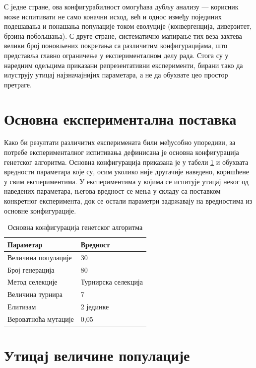 \documentclass[12pt,oneside]{memoir}
\begin{document}
С једне стране, ова конфигурабилност омогућава дубљу анализу — корисник може
испитивати не само коначни исход, већ и однос између појединих подешавања и
понашања популације током еволуције (конвергенција, диверзитет, брзина
побољшања). С друге стране, систематично мапирање тих веза захтева велики
број поновљених покретања са различитим конфигурацијама, што представља
главно ограничење у експерименталном делу рада. Стога су у наредним одељцима
приказани репрезентативни експерименти, бирани тако да илуструју утицај
најзначајнијих параметара, а не да обухвате цео простор претраге.

\section{Основна експериментална поставка}
\label{chp:exp-setup}

Како би резултати различитих експеримената били међусобно 
упоредиви, за потребе експерименталног испитивања дефинисана 
је основна конфигурација генетског алгоритма. Основна 
конфигурација приказана је у табели \ref{tab:ga-base-config} 
и обухвата вредности параметара које су, 
осим уколико није другачије наведено, коришћене у свим 
експериментима. У експериментима у којима се испитује 
утицај неког од наведених параметара, његова вредност 
се мења у складу са поставком конкретног експеримента, 
док се остали параметри задржавају на вредностима из 
основне конфигурације.

\begin{table}[!ht]
  \centering
  \begin{tabular}{ll}
    \toprule
    \textbf{Параметар} & \textbf{Вредност} \\
    \midrule
    Величина популације & 30 \\
    Број генерација & 80 \\
    Метод селекције & Турнирска селекција \\
    Величина турнира & 7 \\
    Елитизам & 2 јединке \\
    Вероватноћа мутације & 0{,}05 \\
    \bottomrule
  \end{tabular}
  \caption{Основна конфигурација генетског алгоритма}
  \label{tab:ga-base-config}
\end{table}

\section{Утицај величине популације}
\label{sec:pop_size}
\end{document}
